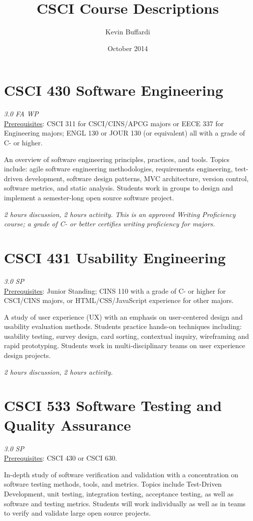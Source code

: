 \documentclass[12pt]{article}
\title{CSCI Course Descriptions}
\author{Kevin Buffardi}
\date{October 2014}
\begin{document}
  \maketitle
  \section*{CSCI 430 Software Engineering}	 	
  \textit{3.0 FA WP} \\
  \underline{Prerequisites}: CSCI 311 for CSCI/CINS/APCG majors or EECE 337 for Engineering majors; ENGL 130 or JOUR 130 (or equivalent) all with a grade of C- or higher.

  An overview of software engineering principles, practices, and tools. Topics include: agile software engineering methodologies, requirements engineering, test-driven development, software design patterns, MVC architecture, version control, software metrics, and static analysis. Students work in groups to design and implement a semester-long open source software project. 

  \textit{2 hours discussion, 2 hours activity. This is an approved Writing Proficiency course; a grade of C- or better certifies writing proficiency for majors.}
  
  \section*{CSCI 431 Usability Engineering}
  \textit{3.0 SP} \\
  \underline{Prerequisites}: Junior Standing; CINS 110 with a grade of C- or higher for CSCI/CINS majors, or HTML/CSS/JavaScript experience for other majors.

  A study of user experience (UX) with an emphasis on user-centered design and usability evaluation methods. Students practice hands-on techniques including: usability testing, survey design, card sorting, contextual inquiry, wireframing and rapid prototyping. Students work in multi-disciplinary teams on user experience design projects.

  \textit{2 hours discussion, 2 hours activity.}

  \section*{CSCI 533 Software Testing and Quality Assurance}
  \textit{3.0 SP} \\
  \underline{Prerequisites}: CSCI 430 or CSCI 630.

   In-depth study of software verification and validation with a concentration on software testing methods, tools, and metrics. Topics include Test-Driven Development, unit testing, integration testing, acceptance testing, as well as software and testing metrics. Students will work individually as well as in teams to verify and validate large open source projects.
\end{document}
